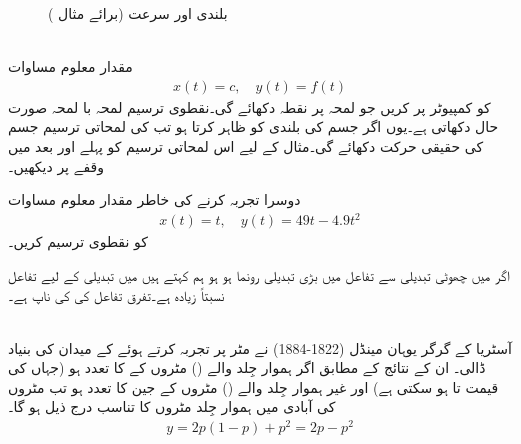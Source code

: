 %
\begin{figure}
\centering
{}
\caption{بلندی اور سرعت (برائے مثال )}
\label{شکل_مثال_تفرق_آزاد_گرنا}
\end{figure}

 \quad {} \\
مقدار معلوم مساوات
\begin{align*}
x(t)=c,\quad y(t)=f(t)
\end{align*}
کو کمپیوٹر پر   کریں جو لمحہ  پر نقطہ  دکھائے گی۔نقطوی ترسیم لمحہ با لمحہ صورت حال دکھاتی ہے۔یوں اگر  جسم کی بلندی کو ظاہر کرتا ہو تب  کی لمحاتی ترسیم جسم کی حقیقی حرکت دکھائے گی۔مثال  کے لیے اس لمحاتی ترسیم کو پہلے  اور بعد میں  وقفے پر دیکھیں۔

دوسرا تجربہ کرنے کی خاطر مقدار معلوم مساوات
\begin{align*}
x(t)=t,\quad y(t)=49t-4.9t^2
\end{align*}
کو نقطوی ترسیم کریں۔


اگر  میں چھوٹی تبدیلی سے  تفاعل  میں بڑی تبدیلی رونما  ہو  ہو  ہم کہتے ہیں  میں تبدیلی کے لیے  تفاعل نسبتاً زیادہ  ہے۔تفرق  تفاعل  کی  کی ناپ ہے۔

\quad {}\\
آسٹریا کے گرگر یوہان مینڈل (1822-1884) نے مٹر پر تجربہ کرتے ہوئے   کے میدان کی بنیاد ڈالی۔ ان کے نتائج کے مطابق اگر ہموار جِلد والے () مٹروں   کے  کا  تعدد  ہو (جہاں  کی قیمت  تا  ہو سکتی ہے) اور غیر  ہموار جِلد والے () مٹروں کے جین کا  تعدد  ہو تب مٹروں کی  آبادی میں ہموار جِلد مٹروں کا  تناسب درج ذیل ہو گا۔
\begin{align*}
y=2p(1-p)+p^2=2p-p^2
\end{align*}

